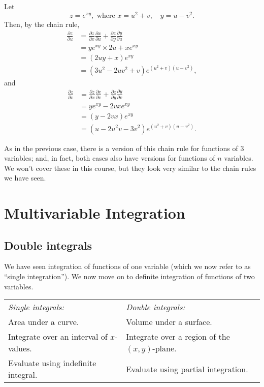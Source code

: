   \begin{example}
    Let
      \[
        z = e^{xy}, \text{ where } x = u^2 + v, \quad y = u - v^2.
      \]
    Then, by the chain rule,
      \begin{align*}
        \frac{\partial z}{\partial u} & = \frac{\partial z}{\partial x}\frac{\partial x}{\partial u} + \frac{\partial z}{\partial y}\frac{\partial y}{\partial u}  \\
        & = ye^{xy} \times 2u + xe^{xy}  \\
        & = (2uy + x)e^{xy}  \\
        & = (3u^2 - 2uv^2 + v)e^{(u^2 + v)(u - v^2)},
      \end{align*}
    and
      \begin{align*}
        \frac{\partial z}{\partial v} & = \frac{\partial z}{\partial x}\frac{\partial x}{\partial v} + \frac{\partial z}{\partial y}\frac{\partial y}{\partial v}  \\
        & = ye^{xy} - 2vxe^{xy}  \\
        & = (y - 2vx)e^{xy}  \\
        & = (u - 2u^2v - 3v^2)e^{(u^2 + v)(u - v^2)}.
      \end{align*}
  \end{example}

  As in the previous case, there is a version of this chain rule for functions of $3$ variables; and, in fact, both cases also have versions for functions of $n$ variables.  We won't cover these in this course, but they look very similar to the chain rules we have seen.









\newpage

\section{Multivariable Integration}

\subsection{Double integrals}

  We have seen integration of functions of one variable (which we now refer to as ``single integration'').  We now move on to definite integration of functions of two variables.

  \begin{tabular}{p{}|p{}}
    \emph{Single integrals:} & \emph{Double integrals:}  \\
    Area under a curve. & Volume under a surface.  \\
    Integrate over an interval of $x$-values. & Integrate over a region of the $(x, y)$-plane.  \\
    Evaluate using indefinite integral. & Evaluate using partial integration.  \\
  \end{tabular}

